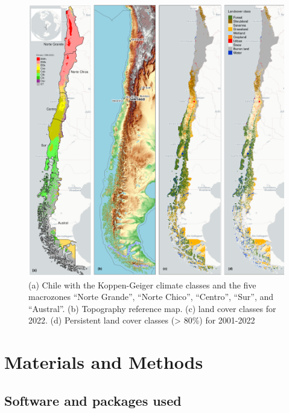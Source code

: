 \documentclass[
  authoryear,
  preprint,
  3p,
  onecolumn]{elsarticle}
\begin{document}
\begin{figure}[!ht]

{\centering \includegraphics{../output/figs/map_study_con_landcover.png}

}

\caption{\label{fig-studyArea}(a) Chile with the Koppen-Geiger climate
classes and the five macrozones ``Norte Grande'', ``Norte Chico'',
``Centro'', ``Sur'', and ``Austral''. (b) Topography reference map. (c)
land cover classes for 2022. (d) Persistent land cover classes
(\textgreater{} 80\%) for 2001-2022}

\end{figure}

\hypertarget{materials-and-methods}{%
\section{Materials and Methods}\label{materials-and-methods}}

\hypertarget{software-and-packages-used}{%
\subsection{Software and packages
used}\label{software-and-packages-used}}
\end{document}
